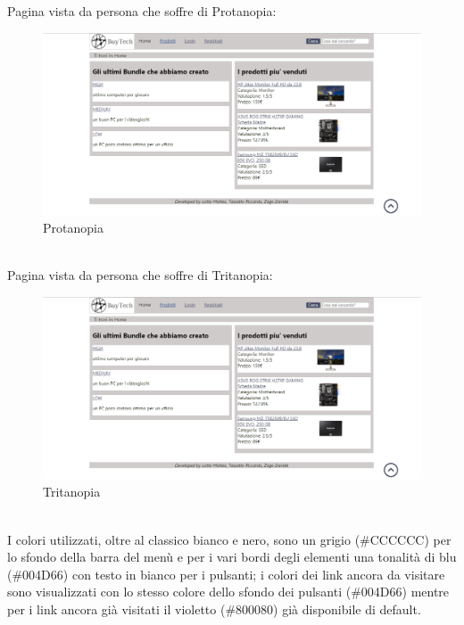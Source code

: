 Pagina vista da persona che soffre di Protanopia:\newline
\begin{figure}[h]
	\label{protanopia}
	\centering %
	\includegraphics[width=1\textwidth]{immagini/homeprota.png}
	\caption{Protanopia} %
\end{figure}\mbox{} \\
Pagina vista da persona che soffre di Tritanopia:\newline
\begin{figure}[h]
	\label{tritanopia}
	\centering %
	\includegraphics[width=1\textwidth]{immagini/hometrita.png}
	\caption{Tritanopia} %
\end{figure}\mbox{} \\
\newline
I colori utilizzati, oltre al classico bianco e nero, sono un grigio (\#CCCCCC) per lo sfondo della barra del menù e per i vari bordi degli elementi una tonalità di blu (\#004D66) con testo in bianco per i pulsanti; i colori dei link ancora da visitare sono visualizzati con lo stesso colore dello sfondo dei pulsanti (\#004D66) mentre per i link ancora già visitati il violetto (\#800080) già disponibile di default.